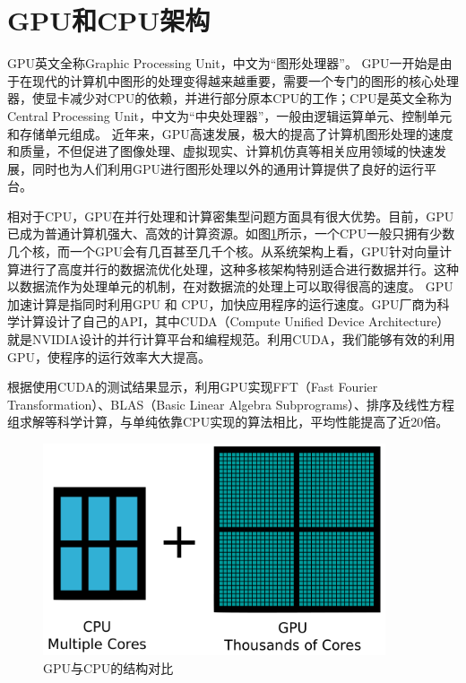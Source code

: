 {\section{GPU和CPU架构}            \label{section:GPU_CPU}
GPU英文全称Graphic Processing Unit，中文为“图形处理器”。
GPU一开始是由于在现代的计算机中图形的处理变得越来越重要，需要一个专门的图形的核心处理器，使显卡减少对CPU的依赖，并进行部分原本CPU的工作；CPU是英文全称为Central Processing Unit，中文为“中央处理器”，一般由逻辑运算单元、控制单元和存储单元组成。
近年来，GPU高速发展，极大的提高了计算机图形处理的速度和质量，不但促进了图像处理、虚拟现实、计算机仿真等相关应用领域的快速发展，同时也为人们利用GPU进行图形处理以外的通用计算提供了良好的运行平台。

相对于CPU，GPU在并行处理和计算密集型问题方面具有很大优势。目前，GPU已成为普通计算机强大、高效的计算资源。如图\ref{fig:GPU}所示，一个CPU一般只拥有少数几个核，而一个GPU会有几百甚至几千个核。从系统架构上看，GPU针对向量计算进行了高度并行的数据流优化处理，这种多核架构特别适合进行数据并行。这种以数据流作为处理单元的机制，在对数据流的处理上可以取得很高的速度。
GPU 加速计算是指同时利用GPU 和 CPU，加快应用程序的运行速度\cite{gpu2008}。GPU厂商为科学计算设计了自己的API，其中CUDA（Compute Unified Device Architecture）就是NVIDIA设计的并行计算平台和编程规范\cite{nvidia2010programming}。利用CUDA，我们能够有效的利用GPU，使程序的运行效率大大提高。

根据使用CUDA的测试结果显示，利用GPU实现FFT（Fast Fourier Transformation）、BLAS（Basic Linear Algebra Subprograms）、排序及线性方程组求解等科学计算，与单纯依靠CPU实现的算法相比，平均性能提高了近20倍。
\begin{figure}[!htb]
    \centering
    \includegraphics[width=0.9\textwidth]{Img/GPU_vs_CPU.png}
    \caption{GPU与CPU的结构对比}
    \label{fig:GPU}
\end{figure}

}
